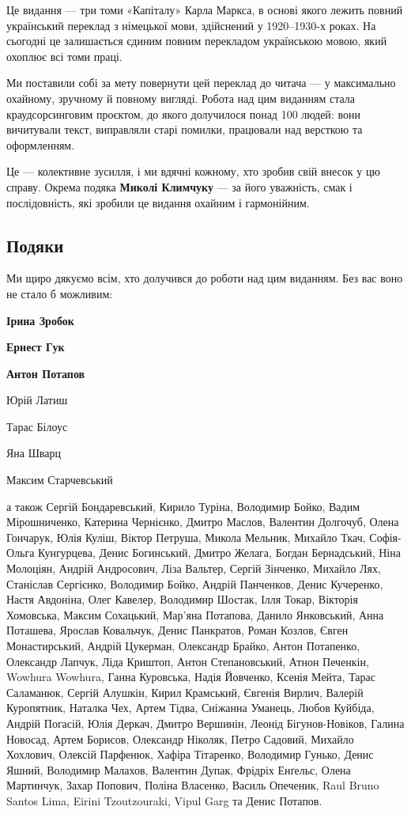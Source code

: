 

Це видання — три томи «Капіталу» Карла Маркса, в основі якого лежить повний
український переклад з німецької мови, здійснений у 1920–1930-х роках.
На сьогодні це залишається єдиним повним перекладом українською мовою, який охоплює всі томи праці.

Ми поставили собі за мету повернути цей переклад до читача — у максимально охайному, зручному й повному вигляді.
Робота над цим виданням стала краудсорсинговим проєктом, до якого долучилося понад 100 людей: вони вичитували текст, виправляли старі помилки, працювали над версткою та оформленням.

Це — колективне зусилля, і ми вдячні кожному, хто зробив свій внесок у цю справу.
Окрема подяка \textbf{Миколі Климчуку} — за його уважність, смак і послідовність, які зробили це видання охайним і гармонійним.

\subsection*{Подяки}

Ми щиро дякуємо всім, хто долучився до роботи над цим виданням. Без вас воно не стало б можливим:

\begin{center}
\textbf{Ірина Зробок}

\textbf{Ернест Гук}

\textbf{Антон Потапов}

Юрій Латиш

Тарас Білоус

Яна Шварц

Максим Старчевський

\end{center}

\noindent{}а також
Сергій Бондаревський,
Кирило Туріна,
Володимир Бойко,
Вадим Мірошниченко,
Катерина Чернієнко,
Дмитро Маслов,
Валентин Долгочуб,
Олена Гончарук,
Юлія Куліш,
Віктор Петруша,
Микола Мельник,
Михайло Ткач,
Софія-Ольга Кунгурцева,
Денис Богинський,
Дмитро Желага,
Богдан Бернадський,
Ніна Молоціян,
Андрій Андросович,
Ліза Вальтер,
Сергій Зінченко,
Михайло Лях,
Станіслав Сергієнко,
Володимир Бойко,
Андрій Панченков,
Денис Кучеренко,
Настя Авдоніна,
Олег Кавелер,
Володимир Шостак,
Ілля Токар,
Вікторія Хомовська,
Максим Сохацький,
Мар'яна Потапова,
Данило Янковський,
Анна Поташева,
Ярослав Ковальчук,
Денис Панкратов,
Роман Козлов,
Євген Монастирський,
Андрій Цукерман,
Олександр Брайко,
Антон Потапенко,
Олександр Лапчук,
Ліда Криштоп,
Антон Степановський,
Атнон Печенкін,
Wowhura Wowhura,
Ганна Куровська,
Надія Йовченко,
Ксенія Мейта,
Тарас Саламанюк,
Сергій Алушкін,
Кирил Крамський,
Євгенія Вирлич,
Валерій Куропятник,
Наталка Чех,
Артем Тідва,
Сніжанна Уманець,
Любов Куйбіда,
Андрій Погасій,
Юлія Деркач,
Дмитро Вершинін,
Леонід Бігунов-Новіков,
Галина Новосад,
Артем Борисов,
Олександр Ніколяк,
Петро Садовий,
Михайло Хохлович,
Олексій Парфенюк,
Хафіра Тітаренко,
Володимир Гунько,
Денис Яшний,
Володимир Малахов,
Валентин Дупак,
Фрідріх Енґельс,
Олена Мартинчук,
Захар Попович,
Поліна Власенко,
Василь Опеченик,
Raul Bruno Santos Lima,
Eirini Tzoutzouraki,
Vipul Garg
та Денис Потапов.

\cleardoublepage
